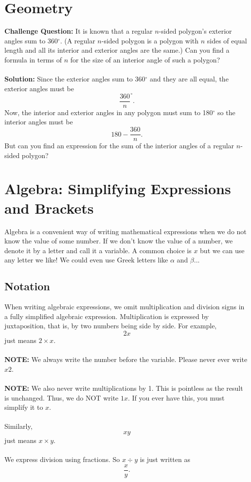 \documentclass{article}
\begin{document}
\section{Geometry}

\textbf{Challenge Question:} It is known that a regular \(n\)-sided polygon's exterior angles sum to 360\(^\circ\). (A regular \(n\)-sided polygon is a polygon with \(n\) sides of equal length and all its interior and exterior angles are the same.) Can you find a formula in terms of \(n\) for the size of an interior angle of such a polygon?
\\
\\
\textbf{Solution:} Since the exterior angles sum to 360\(^\circ\) and they are all equal, the exterior angles must be
\[
\frac{360}{n}^\circ.
\]
Now, the interior and exterior angles in any polygon must sum to 180\(^\circ\) so the interior angles must be
\[
180 - \frac{360}{n}.
\]
But can you find an expression for the sum of the interior angles of a regular \(n\)-sided polygon?
\newpage
\section{Algebra: Simplifying Expressions and Brackets}

Algebra is a convenient way of writing mathematical expressions when we do not know the value of some number. If we don't know the value of a number, we denote it by a letter and call it a variable. A common choice is \(x\) but we can use any letter we like! We could even use Greek letters like \(\alpha\) and \(\beta\)...

\subsection{Notation}
When writing algebraic expressions, we omit multiplication and division signs in a fully simplified algebraic expression. Multiplication is expressed by juxtaposition, that is, by two numbers being side by side. For example,
\[
2x
\]
just means \(2 \times x\). \\
\\
\textbf{NOTE:} We always write the number before the variable. Please never ever write \(x2\).
\\
\\
\textbf{NOTE:} We also never write multiplications by 1. This is pointless as the result is unchanged. Thus, we do NOT write \(1x\). If you ever have this, you must simplify it to \(x\).
\\
\\
Similarly,
\[
xy
\]
just means \(x \times y\). \\
\\
We express division using fractions. So
\(
x \div y
\) is just written as 
\[
\frac{x}{y}.
\]
\end{document}
